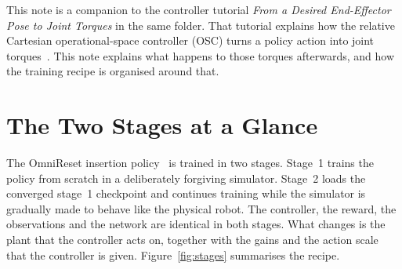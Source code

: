 
This note is a companion to the controller tutorial \emph{From a Desired End-Effector Pose to Joint Torques} in the same folder. That tutorial explains how the relative Cartesian operational-space controller (OSC) turns a policy action into joint torques~\cite{khatib1987unified}. This note explains what happens to those torques afterwards, and how the training recipe is organised around that.

\section{The Two Stages at a Glance}
\label{sec:overview}

The OmniReset insertion policy~\cite{omnireset2026} is trained in two stages. Stage~1 trains the policy from scratch in a deliberately forgiving simulator. Stage~2 loads the converged stage~1 checkpoint and continues training while the simulator is gradually made to behave like the physical robot. The controller, the reward, the observations and the network are identical in both stages. What changes is the plant that the controller acts on, together with the gains and the action scale that the controller is given. Figure~\ref{fig:stages} summarises the recipe.

